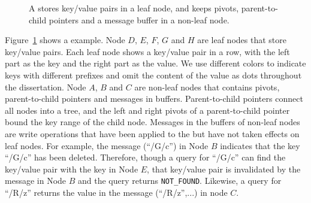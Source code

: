 \begin{figure}[t]
    \caption[A \bet example]{\label{fig:bet} A \bet stores key/value pairs in
        a leaf node, and keeps pivots, parent-to-child pointers and a message
        buffer in a non-leaf node.}
\end{figure}

Figure~\ref{fig:bet} shows a \bet example.
Node $D$, $E$, $F$, $G$ and $H$ are leaf nodes that store key/value pairs.
Each leaf node shows a key/value pair in a row, with the left part as the key
and the right part as the value.
We use different colors to indicate keys with different prefixes and omit the
content of the value as dots throughout the dissertation.
Node $A$, $B$ and $C$ are non-leaf nodes that contains pivots, parent-to-child
pointers and messages in buffers.
Parent-to-child pointers connect all nodes into a tree, and the left and right
pivots of a parent-to-child pointer bound the key range of the child node.
Messages in the buffers of non-leaf nodes are write operations that have been
applied to the \bet but have not taken effects on leaf nodes.
For example, the message \delm(``/G/c'') in Node $B$ indicates that the key
``/G/c'' has been deleted.
Therefore, though a query for ``/G/c'' can find the key/value pair with the
key in Node $E$,
that key/value pair is invalidated by the message in Node $B$ and the
query returns \texttt{NOT\_FOUND}.
Likewise, a query for ``/R/z'' returns the value in the message
\putm(``/R/z'',...) in node $C$.

